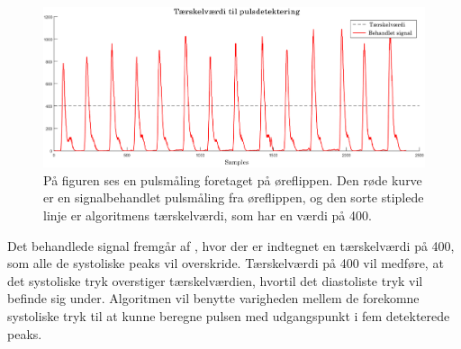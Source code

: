\begin{figure}[H]
	\centering
	\includegraphics[scale=0.37]{figures/cDesign/puls_taerskel.png}
	\caption{På figuren ses en pulsmåling foretaget på øreflippen. Den røde kurve er en signalbehandlet pulsmåling fra øreflippen, og den sorte stiplede linje er algoritmens tærskelværdi, som har en værdi på 400.}
	\label{fig:taerskel_puls}
\end{figure}\vspace{-.25cm}
Det behandlede signal fremgår af , hvor der er indtegnet en tærskelværdi på 400, som alle de systoliske peaks vil overskride. Tærskelværdi på 400 vil medføre, at det systoliske tryk overstiger tærskelværdien, hvortil det diastoliste tryk vil befinde sig under. Algoritmen vil benytte varigheden mellem de forekomne systoliske tryk til at kunne beregne pulsen med udgangspunkt i fem detekterede peaks. 

